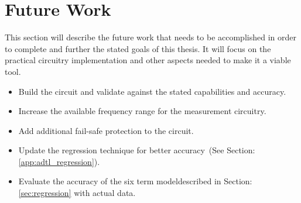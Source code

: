 \section {Future Work}
\label{sec:futureWork}

\ifisPPT
\else
This section will describe the future work that needs to be accomplished in order to complete and further the stated goals of this thesis. It will focus on the practical circuitry implementation and other aspects needed to make it a viable tool.
\fi

\begin{itemize}
    \item Build the circuit and validate against the stated capabilities and accuracy.
    \item Increase the available frequency range for the measurement circuitry.
    \item Add additional fail-safe protection to the circuit.
    \item Update the regression technique for better accuracy\ifisPPT \else~(See Section: \ref{app:adtl_regression})\fi.
    \item Evaluate the accuracy of the six term model\ifisPPT \else described in Section: \ref{sec:regression} with actual data\fi.
\end{itemize}

